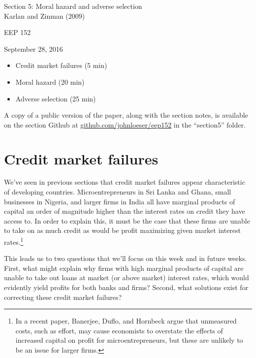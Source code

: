 \documentclass[12pt,english]{article}
\begin{document}
\begin{center}
{\Large{}Section 5: Moral hazard and adverse selection} \\
{\large{}Karlan and Zinman (2009)}
\par\end{center}{\Large \par}

\begin{center}
EEP 152
\par\end{center}

\begin{center}
September 28, 2016
\par\end{center}

\begin{itemize}
	\setlength\itemsep{-0.5em}
	\item Credit market failures (5 min)
	\item Moral hazard (20 min)
	\item Adverse selection (25 min)
\end{itemize}
A copy of a public version of the paper, along with the section notes, is available on the section Github at \href{github.com/johnloeser/eep152}{github.com/johnloeser/eep152} in the ``section5'' folder.

\section{Credit market failures}

We've seen in previous sections that credit market failures appear characteristic of developing countries. Microentrepreneurs in Sri Lanka and Ghana, small businesses in Nigeria, and larger firms in India all have marginal products of capital an order of magnitude higher than the interest rates on credit they have access to. In order to explain this, it must be the case that these firms are unable to take on as much credit as would be profit maximizing given market interest rates.\footnote{In a recent paper, Banerjee, Duflo, and Hornbeck argue that unmeasured costs, such as effort, may cause economists to overstate the effects of increased capital on profit for microentrepreneurs, but these are unlikely to be an issue for larger firms.}

This leads us to two questions that we'll focus on this week and in future weeks. First, what might explain why firms with high marginal products of capital are unable to take out loans at market (or above market) interest rates, which would evidently yield profits for both banks and firms? Second, what solutions exist for correcting these credit market failures?
\end{document}
